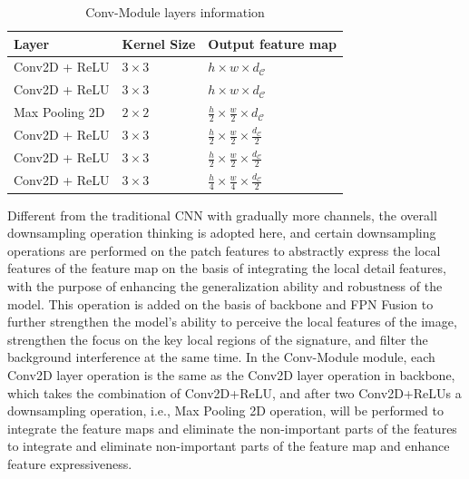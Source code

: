 \begin{table}[htbp]
\caption{Conv-Module layers information}  
\begin{center}
\begin{tabu} to 0.8\textwidth{X[3, c]X[3, c]X[3, c]}  
\toprule
Layer & Kernel Size & Output feature map\\
\midrule
Conv2D + ReLU & $3\times 3$ & $h\times w\times d_\mathcal{C}$ \\ 
Conv2D + ReLU & $3\times 3$ & $h\times w\times d_\mathcal{C}$ \\ 
Max Pooling 2D & $2\times 2$ & $\frac{h}{2}\times \frac{w}{2}\times d_\mathcal{C}$ \\ 
Conv2D + ReLU & $3\times 3$ & $\frac{h}{2}\times \frac{w}{2}\times \frac{d_\mathcal{C}}{2}$ \\ 
Conv2D + ReLU & $3\times 3$ & $\frac{h}{2}\times \frac{w}{2}\times \frac{d_\mathcal{C}}{2}$ \\ 
Conv2D + ReLU & $3\times 3$ & $\frac{h}{4}\times \frac{w}{4}\times \frac{d_\mathcal{C}}{2}$ \\ 
\bottomrule
\end{tabu}
\end{center}
\label{tab:conv}
\end{table}

Different from the traditional CNN with gradually more channels, the overall downsampling operation thinking is adopted here, and certain downsampling operations are performed on the patch features to abstractly express the local features of the feature map on the basis of integrating the local detail features, with the purpose of enhancing the generalization ability and robustness of the model. This operation is added on the basis of backbone and FPN Fusion to further strengthen the model's ability to perceive the local features of the image, strengthen the focus on the key local regions of the signature, and filter the background interference at the same time. In the Conv-Module module, each Conv2D layer operation is the same as the Conv2D layer operation in backbone, which takes the combination of Conv2D+ReLU, and after two Conv2D+ReLUs a downsampling operation, i.e., Max Pooling 2D operation, will be performed to integrate the feature maps and eliminate the non-important parts of the features to integrate and eliminate non-important parts of the feature map and enhance feature expressiveness.

